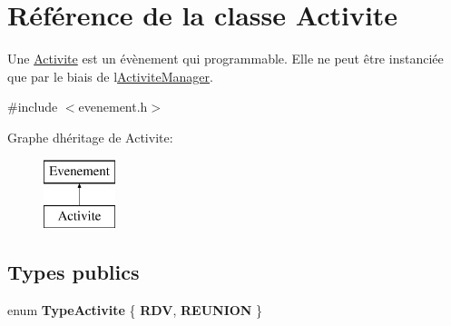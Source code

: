 \hypertarget{class_activite}{}\section{Référence de la classe Activite}
\label{class_activite}


Une \hyperlink{class_activite}{Activite} est un évènement qui programmable. Elle ne peut être instanciée que par le biais de l\textquotesingle{}\hyperlink{class_activite_manager}{Activite\+Manager}.  




{\ttfamily \#include $<$evenement.\+h$>$}

Graphe d\textquotesingle{}héritage de Activite\+:\begin{figure}[H]
\begin{center}
\leavevmode
\includegraphics[height=2.000000cm]{class_activite}
\end{center}
\end{figure}
\subsection*{Types publics}
\begin{DoxyCompactItemize}
\item 
\hypertarget{class_activite_a5553b707c56acfc1dd945f47288f8a66}{}enum {\bfseries Type\+Activite} \{ {\bfseries R\+D\+V}, 
{\bfseries R\+E\+U\+N\+I\+O\+N}
 \}\label{class_activite_a5553b707c56acfc1dd945f47288f8a66}

\end{DoxyCompactItemize}

